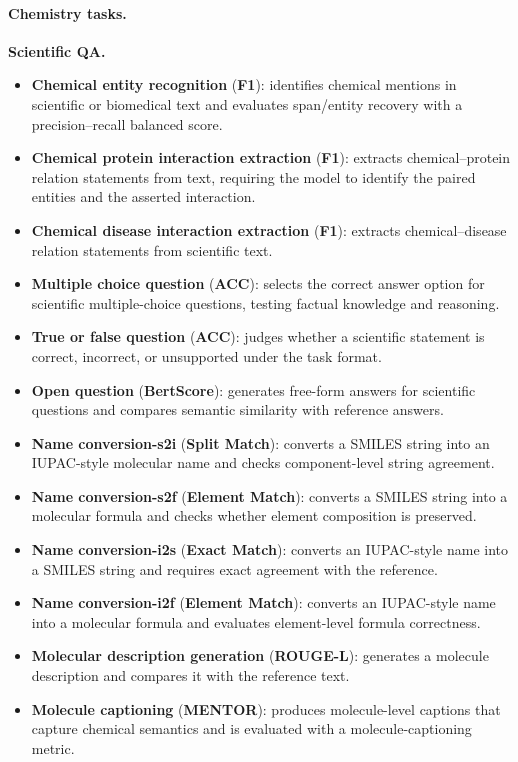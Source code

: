 \begin{appendices}
\paragraph{Chemistry tasks.}
\textbf{Scientific QA.}
\begin{itemize}
    \item \textbf{Chemical entity recognition} (\textbf{F1}): identifies chemical mentions in scientific or biomedical text and evaluates span/entity recovery with a precision--recall balanced score.
    \item \textbf{Chemical protein interaction extraction} (\textbf{F1}): extracts chemical--protein relation statements from text, requiring the model to identify the paired entities and the asserted interaction.
    \item \textbf{Chemical disease interaction extraction} (\textbf{F1}): extracts chemical--disease relation statements from scientific text.
    \item \textbf{Multiple choice question} (\textbf{ACC}): selects the correct answer option for scientific multiple-choice questions, testing factual knowledge and reasoning.
    \item \textbf{True or false question} (\textbf{ACC}): judges whether a scientific statement is correct, incorrect, or unsupported under the task format.
    \item \textbf{Open question} (\textbf{BertScore}): generates free-form answers for scientific questions and compares semantic similarity with reference answers.
    \item \textbf{Name conversion-s2i} (\textbf{Split Match}): converts a SMILES string into an IUPAC-style molecular name and checks component-level string agreement.
    \item \textbf{Name conversion-s2f} (\textbf{Element Match}): converts a SMILES string into a molecular formula and checks whether element composition is preserved.
    \item \textbf{Name conversion-i2s} (\textbf{Exact Match}): converts an IUPAC-style name into a SMILES string and requires exact agreement with the reference.
    \item \textbf{Name conversion-i2f} (\textbf{Element Match}): converts an IUPAC-style name into a molecular formula and evaluates element-level formula correctness.
    \item \textbf{Molecular description generation} (\textbf{ROUGE-L}): generates a molecule description and compares it with the reference text.
    \item \textbf{Molecule captioning} (\textbf{MENTOR}): produces molecule-level captions that capture chemical semantics and is evaluated with a molecule-captioning metric.
\end{itemize}


\end{appendices}
